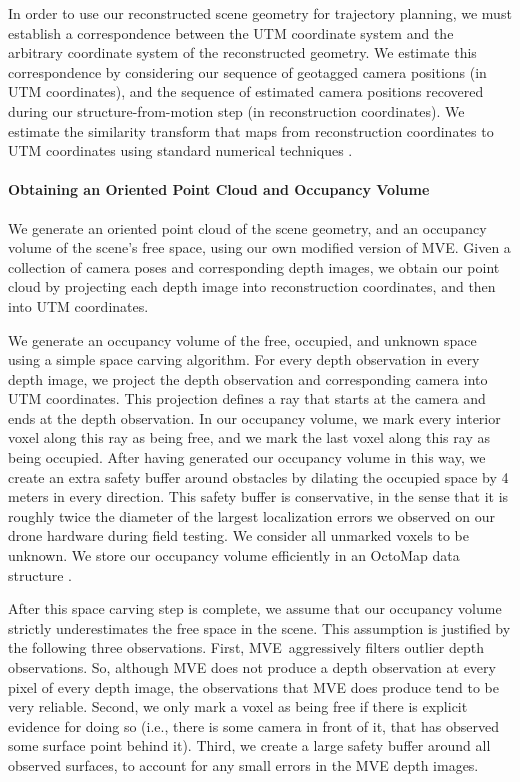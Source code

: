 In order to use our reconstructed scene geometry for trajectory planning, we must establish a correspondence between the UTM coordinate system and the arbitrary coordinate system of the reconstructed geometry.
We estimate this correspondence by considering our sequence of geotagged camera positions (in UTM coordinates), and the sequence of estimated camera positions recovered during our structure-from-motion step (in reconstruction coordinates).
We estimate the similarity transform that maps from reconstruction coordinates to UTM coordinates using standard numerical techniques \cite{sorkine:2017}.

\paragraph{Obtaining an Oriented Point Cloud and Occupancy Volume}
We generate an oriented point cloud of the scene geometry, and an occupancy volume of the scene's free space, using our own modified version of MVE.
Given a collection of camera poses and corresponding depth images, we obtain our point cloud by projecting each depth image into reconstruction coordinates, and then into UTM coordinates.

We generate an occupancy volume of the free, occupied, and unknown space using a simple space carving algorithm.
For every depth observation in every depth image, we project the depth observation and corresponding camera into UTM coordinates.
This projection defines a ray that starts at the camera and ends at the depth observation.
In our occupancy volume, we mark every interior voxel along this ray as being free, and we mark the last voxel along this ray as being occupied.
After having generated our occupancy volume in this way, we create an extra safety buffer around obstacles by dilating the occupied space by 4 meters in every direction.
This safety buffer is conservative, in the sense that it is roughly twice the diameter of the largest localization errors we observed on our drone hardware during field testing.
We consider all unmarked voxels to be unknown.
We store our occupancy volume efficiently in an OctoMap data structure \cite{hornung:2013}.

After this space carving step is complete, we assume that our occupancy volume strictly underestimates the free space in the scene.
This assumption is justified by the following three observations.
First, MVE\ aggressively filters outlier depth observations. So, although MVE does not produce a depth observation at every pixel of every depth image, the observations that MVE does produce tend to be very reliable.
Second, we only mark a voxel as being free if there is explicit evidence for doing so (i.e., there is some camera in front of it, that has observed some surface point behind it).
Third, we create a large safety buffer around all observed surfaces, to account for any small errors in the MVE depth images.

